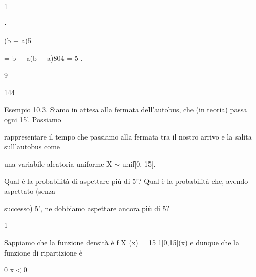 \documentclass[a4paper,portrait,12pt]{article}
\begin{document}
1





⋅





\begin{flushleft}
(b $-$ a)5
\end{flushleft}





\begin{flushleft}
= b $-$ a(b $-$ a)804 = 5 .
\end{flushleft}


9





144





\begin{flushleft}
Esempio 10.3. Siamo in attesa alla fermata dell'autobus, che (in teoria) passa ogni 15'. Possiamo
\end{flushleft}


\begin{flushleft}
rappresentare il tempo che passiamo alla fermata tra il nostro arrivo e la salita sull'autobus come
\end{flushleft}


\begin{flushleft}
una variabile aleatoria uniforme X $\sim$ unif[0, 15].
\end{flushleft}


\begin{flushleft}
Qual \`{e} la probabilit\`{a} di aspettare più di 5'? Qual \`{e} la probabilit\`{a} che, avendo aspettato (senza
\end{flushleft}


\begin{flushleft}
successo) 5', ne dobbiamo aspettare ancora più di 5?
\end{flushleft}


1


\begin{flushleft}
Sappiamo che la funzione densit\`{a} \`{e} f X (x) = 15 1[0,15](x) e dunque che la funzione di ripartizione \`{e}
\end{flushleft}


\begin{flushleft}
0 x$<$0
\end{flushleft}
\end{document}
